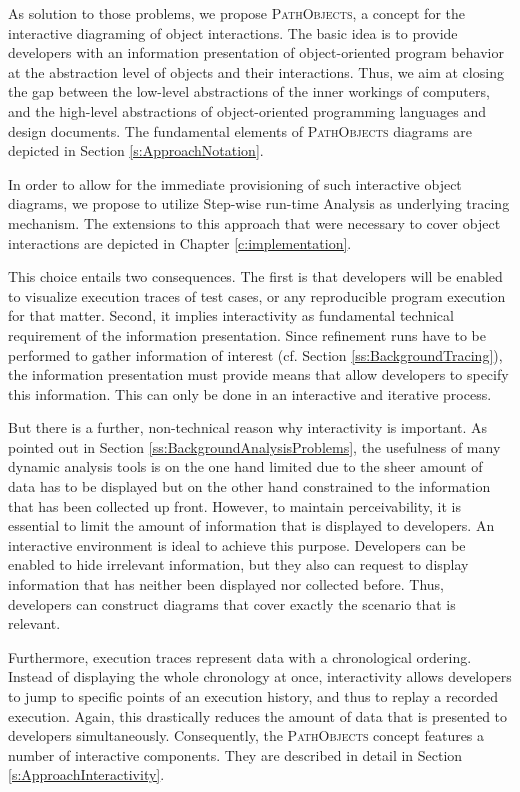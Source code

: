 As solution to those problems, we propose \textsc{PathObjects}, a concept for the interactive diagraming of object interactions.
The basic idea is to provide developers with an information presentation of object-oriented program behavior at the abstraction level of objects and their interactions.
Thus, we aim at closing the gap between the low-level abstractions of the inner workings of computers, and the high-level abstractions of object-oriented programming languages and design documents.
The fundamental elements of \textsc{PathObjects} diagrams are depicted in Section \ref{s:ApproachNotation}.

In order to allow for the immediate provisioning of such interactive object diagrams, we propose to utilize Step-wise run-time Analysis as underlying tracing mechanism.
The extensions to this approach that were necessary to cover object interactions are depicted in Chapter \ref{c:implementation}.

This choice entails two consequences.
The first is that developers will be enabled to visualize execution traces of test cases, or any reproducible program execution for that matter.
Second, it implies interactivity as fundamental technical requirement of the information presentation.
Since refinement runs have to be performed to gather information of interest (cf. Section \ref{ss:BackgroundTracing}), the information presentation must provide means that allow developers to specify this information.
This can only be done in an interactive and iterative process.

But there is a further, non-technical reason why interactivity is important.
As pointed out in Section \ref{ss:BackgroundAnalysisProblems}, the usefulness of many dynamic analysis tools is on the one hand limited due to the sheer amount of data has to be displayed but on the other hand constrained to the information that has been collected up front.
However, to maintain perceivability, it is essential to limit the amount of information that is displayed to developers.
An interactive environment is ideal to achieve this purpose.
Developers can be enabled to hide irrelevant information, but they also can request to display information that has neither been displayed nor collected before.
Thus, developers can construct diagrams that cover exactly the scenario that is relevant.

Furthermore, execution traces represent data with a chronological ordering.
Instead of displaying the whole chronology at once, interactivity allows developers to jump to specific points of an execution history, and thus to replay a recorded execution.
Again, this drastically reduces the amount of data that is presented to developers simultaneously.
Consequently, the \textsc{PathObjects} concept features a number of interactive components.
They are described in detail in Section \ref{s:ApproachInteractivity}.

